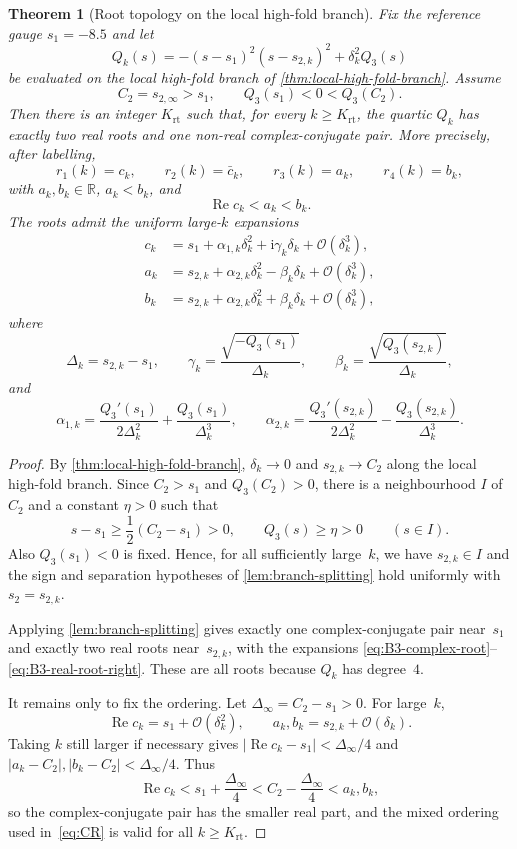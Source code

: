\documentclass[11pt,a4paper]{article}
\theoremstyle{plain}
\newtheorem{theorem}{Theorem}[section]
\theoremstyle{definition}
\theoremstyle{remark}
\DeclareMathOperator{\Real}{Re}
\newcommand{\RR}{\mathbb{R}}
\newcommand{\ii}{\mathrm{i}}
\newcommand{\abs}[1]{\lvert #1 \rvert}
\newcommand{\Oo}{\mathcal{O}}
\begin{document}
\begin{theorem}[Root topology on the local high-fold branch]
\label{thm:large-fold-root-topology}
Fix the reference gauge $s_1=-8.5$ and let
\[
  Q_k(s)=-(s-s_1)^2(s-s_{2,k})^2+\delta_k^2Q_3(s)
\]
be evaluated on the local high-fold branch of
\cref{thm:local-high-fold-branch}.  Assume
\[
  C_2=s_{2,\infty}>s_1,
  \qquad
  Q_3(s_1)<0<Q_3(C_2).
\]
Then there is an integer $K_{\mathrm{rt}}$ such that, for every
$k\ge K_{\mathrm{rt}}$, the quartic $Q_k$ has exactly two real
roots and one non-real complex-conjugate pair.  More precisely, after
labelling,
\[
  r_1(k)=c_k,\qquad r_2(k)=\bar c_k,\qquad
  r_3(k)=a_k,\qquad r_4(k)=b_k,
\]
with $a_k,b_k\in\RR$, $a_k<b_k$, and
\[
  \Real c_k<a_k<b_k .
\]
The roots admit the uniform large-$k$ expansions
\begin{align}
  c_k
  &=
  s_1+\alpha_{1,k}\delta_k^2
  +\ii\gamma_k\delta_k+\Oo(\delta_k^3),
  \label{eq:B3-complex-root}\\
  a_k
  &=
  s_{2,k}+\alpha_{2,k}\delta_k^2
  -\beta_k\delta_k+\Oo(\delta_k^3),
  \label{eq:B3-real-root-left}\\
  b_k
  &=
  s_{2,k}+\alpha_{2,k}\delta_k^2
  +\beta_k\delta_k+\Oo(\delta_k^3),
  \label{eq:B3-real-root-right}
\end{align}
where
\[
  \Delta_k=s_{2,k}-s_1,\qquad
  \gamma_k=\frac{\sqrt{-Q_3(s_1)}}{\Delta_k},
  \qquad
  \beta_k=\frac{\sqrt{Q_3(s_{2,k})}}{\Delta_k},
\]
and
\[
  \alpha_{1,k}
  =
  \frac{Q_3'(s_1)}{2\Delta_k^2}
  +\frac{Q_3(s_1)}{\Delta_k^3},
  \qquad
  \alpha_{2,k}
  =
  \frac{Q_3'(s_{2,k})}{2\Delta_k^2}
  -\frac{Q_3(s_{2,k})}{\Delta_k^3}.
\]
\end{theorem}

\begin{proof}
By \cref{thm:local-high-fold-branch},
$\delta_k\to0$ and $s_{2,k}\to C_2$ along the local high-fold
branch.  Since $C_2>s_1$ and $Q_3(C_2)>0$, there is a neighbourhood
$I$ of~$C_2$ and a constant $\eta>0$ such that
\[
  s-s_1\ge \frac12(C_2-s_1)>0,
  \qquad
  Q_3(s)\ge\eta>0
  \qquad (s\in I).
\]
Also $Q_3(s_1)<0$ is fixed.  Hence, for all sufficiently large~$k$,
we have $s_{2,k}\in I$ and the sign and separation hypotheses of
\cref{lem:branch-splitting} hold uniformly with
$s_2=s_{2,k}$.

Applying \cref{lem:branch-splitting} gives exactly one
complex-conjugate pair near~$s_1$ and exactly two real roots
near~$s_{2,k}$, with the expansions
\eqref{eq:B3-complex-root}--\eqref{eq:B3-real-root-right}.  These are
all roots because $Q_k$ has degree~$4$.

It remains only to fix the ordering.  Let
$\Delta_\infty=C_2-s_1>0$.  For large~$k$,
\[
  \Real c_k=s_1+\Oo(\delta_k^2),
  \qquad
  a_k,b_k=s_{2,k}+\Oo(\delta_k).
\]
Taking $k$ still larger if necessary gives
$\abs{\Real c_k-s_1}<\Delta_\infty/4$ and
$\abs{a_k-C_2},\abs{b_k-C_2}<\Delta_\infty/4$.  Thus
\[
  \Real c_k < s_1+\frac{\Delta_\infty}{4}
  < C_2-\frac{\Delta_\infty}{4}
  < a_k,b_k,
\]
so the complex-conjugate pair has the smaller real part, and the
mixed ordering used in~\eqref{eq:CR} is valid for all
$k\ge K_{\mathrm{rt}}$.
\end{proof}
\end{document}
